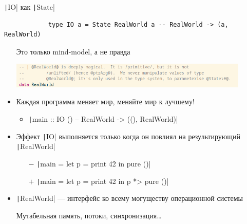    \begin{frame}[fragile]{\texttt|IO| как \texttt|State|}
        \vspace{-0.5em}
        \begin{verbatim}
            type IO a = State RealWorld a -- RealWorld -> (a, RealWorld)
        \end{verbatim}
        \begin{itemize}
            \item[\NB] Это только mind-model, а не правда
            \begin{center}
                \includegraphics[width=0.9\textwidth]{figs/real_world}
            \end{center}
            \item Каждая программа меняет мир, меняйте мир к лучшему!
            \begin{itemize}
                \item \texttt|main :: IO () -- RealWorld -> ((), RealWorld)|
            \end{itemize}
            \item Эффект \texttt|IO| выполняется только когда он повлиял на результирующий \texttt|RealWorld|
            \begin{itemize}
                \item[$-$] \texttt|main = let p = print 42 in pure ()|
                \item[$+$] \texttt|main = let p = print 42 in p *> pure ()|
            \end{itemize}
            \item \texttt|RealWorld| --- интерфейс ко всему могуществу операционной системы
            \item[\eg] Мутабельная память, потоки, синхронизация\ldots
        \end{itemize}
    \end{frame}

